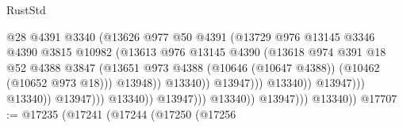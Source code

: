 \begin{lexlean}{RustStd}
\begin{coremodule}
                                                      @28
                                                      @4391
                                                      @3340
                                                      (@13626
                                                        @977
                                                        @50
                                                        @4391
                                                        (@13729
                                                          @976
                                                          @13145
                                                          @3346
                                                          @4390
                                                          @3815
                                                          @10982
                                                          (@13613
                                                            @976
                                                            @13145
                                                            @4390
                                                            (@13618
                                                              @974
                                                              @391
                                                              @18
                                                              @52
                                                              @4388
                                                              @3847
                                                              (@13651
                                                                @973
                                                                @4388
                                                                (@10646 (@10647 @4388))
                                                                (@10462 (@10652 @973 @18)))
                                                              @13948))
                                                          @13340))
                                                      @13947)))
                                                @13340))
                                            @13947)))
                                      @13340))
                                  @13947)))
                            @13340))
                        @13947)))
                  @13340))
              @13947)))
        @13340))
@17707 := @17235
    (@17241
      (@17244
        (@17250
          (@17256

\end{coremodule}
\end{lexlean}
